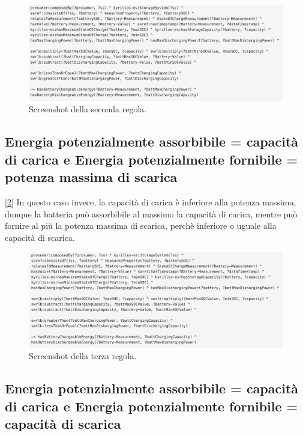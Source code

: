 \begin{figure}[H]
    \centering
    \includegraphics[width=15cm]{images/charging <=.png}
    \caption{Screenshot della seconda regola.}
    \label{fig:charginglessorequal}
\end{figure}


\subsection{Energia potenzialmente assorbibile = capacità di carica e Energia potenzialmente fornibile = potenza massima di scarica}

[\ref*{fig:charginggreater}] In questo caso invece, la capacità di carica è inferiore alla potenza massima, dunque la batteria può assorbibile al massimo la capacità di carica,
mentre può fornire al più la potenza massima di scarica, perchè inferiore o uguale alla capacità di scarica.

\begin{figure}[H]
    \centering
    \includegraphics[width=15cm]{images/charging >.png}
    \caption{Screenshot della terza regola.}
    \label{fig:charginggreater}
\end{figure}

\subsection{Energia potenzialmente assorbibile = capacità di carica e Energia potenzialmente fornibile = capacità di scarica}


